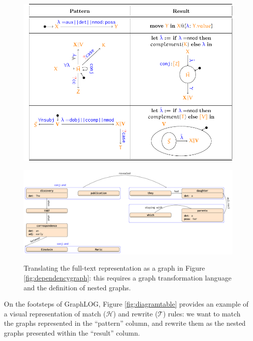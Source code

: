 \begin{figure}[!pth]
	\begin{minipage}[b]{\textwidth}
		\centering
		\includegraphics[width=\textwidth]{fig/05language/diagramtable}
		\label{fig:diagramtable}
	\end{minipage}
	\begin{minipage}[b]{\textwidth}
		\centering
		\includegraphics[width=1.2\textwidth]{fig/05language/nestedrepr}
		\label{fig:nestedrepr}
	\end{minipage}
	\caption{Translating the full-text representation as a graph in Figure \ref{fig:dependencygraph}: this requires a graph transformation language and the definition of nested graphs.}
	\label{fig:globalconversiontext}
\end{figure}
	On the footsteps of GraphLOG, Figure \ref{fig:diagramtable} provides an example of a visual representation of match ($\mathcal{H}$) and rewrite ($\mathcal{T}$) rules: we want to match the graphs represented in the ``pattern'' column, and rewrite them as the nested graphs presented within the ``result'' column. 
